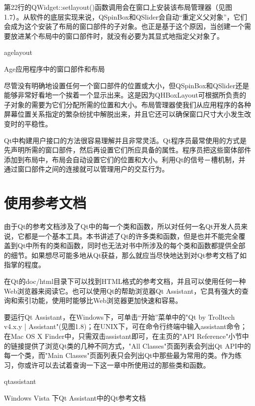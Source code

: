 \documentclass[11pt,oneside]{book}
\begin{document}
\begin{common-format}
第22行的QWidget::setlayout()函数调用会在窗口上安装该布局管理器（见图1.7）。从软件的底层实现来说，QSpinBox和QSlider会自动“重定义父对象”，它们会成为这个安装了布局的窗口部件的子对象。也正是基于这个原因，当创建一个需要放进某个布局中的窗口部件时，就没有必要为其显式地指定父对象了。

\begin{linefig}[0.8]{agelayout}
\caption{Age应用程序中的窗口部件和布局}
\label{fig:agelayout}
\end{linefig}

尽管没有明确地设置任何一个窗口部件的位置或大小，但QSpinBox和QSlider还是能够非常好看地一个挨着一个显示出来。这是因为QHBoxLayout可根据所负责的子对象的需要为它们分配所需的位置和大小。布局管理器使我们从应用程序的各种屏幕位置关系指定的繁杂纷扰中解脱出来，并且它还可以确保窗口尺寸大小发生改变时的平稳性。

Qt中构建用户接口的方法很容易理解并且非常灵活。Qt程序员最常使用的方式是先声明所需的窗口部件，然后再设置它们所应具备的属性。程序员把这些窗体部件添加到布局中，布局会自动设置它们的位置和大小。利用Qt的信号－槽机制，并通过窗口部件之间的连接就可以管理用户的交互行为。


\section{使用参考文档}
由于Qt的参考文档涉及了Qt中的每一个类和函数，所以对任何一名Qt开发人员来说，它都是一个基本工具。本书讲述了Qt的许多类和函数，但是也并不能完全覆盖到Qt中所有的类和函数，同时也无法对书中所涉及的每个类和函数都提供全部的细节。如果想尽可能多地从Qt获益，那么就应当尽快地达到对Qt参考文档了如指掌的程度。

在Qt的doc/html目录下可以找到HTML格式的参考文档，并且可以使用任何一种Web浏览器来阅读它。也可以使用Qt的帮助浏览器Qt Assistant，它具有强大的查询和索引功能，使用时能够比Web浏览器更加快速和容易。

要运行Qt Assistant，在Windows下，可单击“开始”菜单中的"Qt by Trolltech v4.x.y | Assistant"(见图1.8)；在UNIX下，可在命令行终端中输入assistant命令；在Mac  OS X Finder中，只需双击assistant即可，在主页的"API Reference"小节中的链接提供了浏览Qt类的几种不同方式，"All Classes"页面列表会列出Qt API中的每一个类，而"Main Classes"页面列表只会列出Qt中那些最为常用的类。作为练习，你或许可以去试着查询一下这一章中所使用过的那些类和函数。
\begin{linefig}[0.8]{qtassistant}
\caption{Windows Vista 下Qt Assistant中的Qt参考文档}
\label{fig:qtassistant}
\end{linefig}


\end{common-format}
\end{document}
